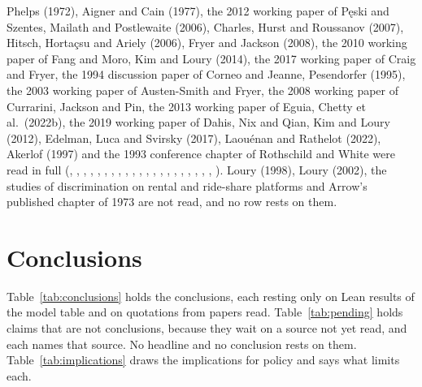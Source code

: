 Phelps (1972), Aigner and Cain (1977), the 2012 working paper of P\k{e}ski and
Szentes, Mailath and Postlewaite (2006), Charles, Hurst and Roussanov
(2007), Hitsch, Horta\c{c}su and Ariely (2006), Fryer and Jackson (2008),
the 2010 working paper of Fang and Moro, Kim and Loury (2014), the 2017
working paper of Craig and Fryer, the 1994 discussion paper of Corneo and
Jeanne, Pesendorfer (1995), the 2003 working paper of Austen-Smith and
Fryer, the 2008 working paper of Currarini, Jackson and Pin, the 2013
working paper of Eguia, Chetty et al.\ (2022b), the 2019 working paper of
Dahis, Nix and Qian, Kim and Loury (2012), Edelman, Luca and Svirsky (2017),
Laou\'enan and Rathelot (2022), Akerlof (1997) and the 1993 conference
chapter of Rothschild and White were read in full
(,
, ,
,
,
, ,
, ,
, ,
, ,
, ,
, ,
, ,
, ,
). Loury (1998),
Loury (2002), the studies of discrimination on rental and ride-share
platforms and Arrow's published chapter of 1973 are
not read, and no row rests on them.

\section{Conclusions}

Table~\ref{tab:conclusions} holds the conclusions, each resting only on
Lean results of the model table and on quotations from papers read.
Table~\ref{tab:pending} holds claims that are not conclusions, because they
wait on a source not yet read, and each names that source. No headline and
no conclusion rests on them. Table~\ref{tab:implications} draws the
implications for policy and says what limits each.

